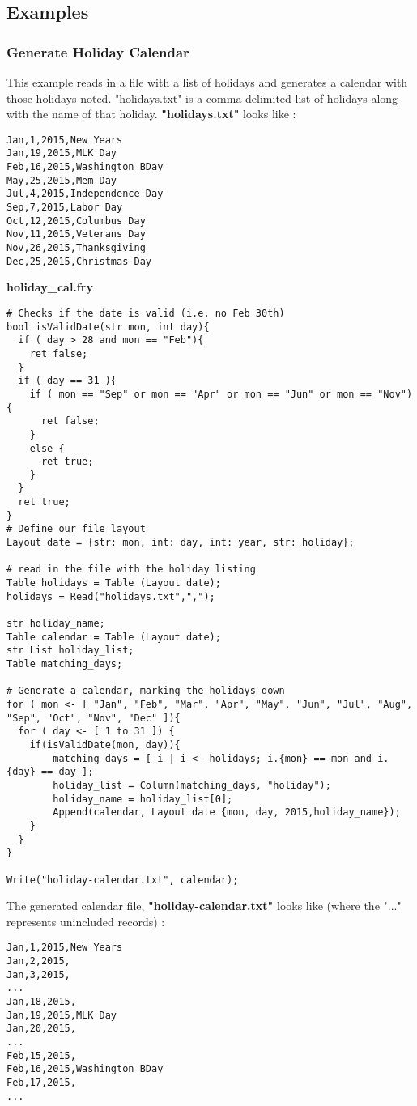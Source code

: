 \documentclass{article}
\begin{document}
\subsection{Examples}
\subsubsection{Generate Holiday Calendar}
\label{sec:cal_example}
This example reads in a file with a list of holidays and generates a calendar with those holidays noted. "holidays.txt" is a comma delimited list of holidays along with the name of that holiday. \textbf{"holidays.txt"} looks like :
\begin{lstlisting}
Jan,1,2015,New Years
Jan,19,2015,MLK Day
Feb,16,2015,Washington BDay
May,25,2015,Mem Day
Jul,4,2015,Independence Day
Sep,7,2015,Labor Day
Oct,12,2015,Columbus Day
Nov,11,2015,Veterans Day
Nov,26,2015,Thanksgiving
Dec,25,2015,Christmas Day
\end{lstlisting}
\textbf{holiday\_cal.fry}
\begin{lstlisting}
# Checks if the date is valid (i.e. no Feb 30th)
bool isValidDate(str mon, int day){
  if ( day > 28 and mon == "Feb"){
    ret false;
  }
  if ( day == 31 ){
    if ( mon == "Sep" or mon == "Apr" or mon == "Jun" or mon == "Nov"){
      ret false;
    }
    else {
      ret true;
    }
  }
  ret true;
}
# Define our file layout
Layout date = {str: mon, int: day, int: year, str: holiday};

# read in the file with the holiday listing
Table holidays = Table (Layout date);
holidays = Read("holidays.txt",",");

str holiday_name;
Table calendar = Table (Layout date);
str List holiday_list;
Table matching_days;

# Generate a calendar, marking the holidays down
for ( mon <- [ "Jan", "Feb", "Mar", "Apr", "May", "Jun", "Jul", "Aug", "Sep", "Oct", "Nov", "Dec" ]){
  for ( day <- [ 1 to 31 ]) {
    if(isValidDate(mon, day)){
        matching_days = [ i | i <- holidays; i.{mon} == mon and i.{day} == day ];
        holiday_list = Column(matching_days, "holiday");
        holiday_name = holiday_list[0];
        Append(calendar, Layout date {mon, day, 2015,holiday_name});
    }
  }
}

Write("holiday-calendar.txt", calendar);
\end{lstlisting}
The generated calendar file, \textbf{"holiday-calendar.txt"} looks like (where the "..." represents unincluded records) :
\begin{lstlisting}
Jan,1,2015,New Years
Jan,2,2015,
Jan,3,2015,
...
Jan,18,2015,
Jan,19,2015,MLK Day
Jan,20,2015,
...
Feb,15,2015,
Feb,16,2015,Washington BDay
Feb,17,2015,
...
\end{lstlisting}
\end{document}
